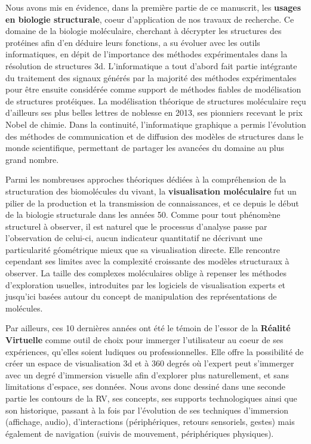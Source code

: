 Nous avons mis en évidence, dans la première partie de ce manuscrit, les \textbf{usages en biologie structurale}, coeur d'application de nos travaux de recherche. Ce domaine de la biologie moléculaire, cherchant à décrypter les structures des protéines afin d'en déduire leurs fonctions, a su évoluer avec les outils informatiques, en dépit de l'importance des méthodes expérimentales dans la résolution de structures 3d. 
L'informatique a tout d'abord fait partie intégrante du traitement des signaux générés par la majorité des méthodes expérimentales pour être ensuite considérée comme support de méthodes fiables de modélisation de structures protéiques. La modélisation théorique de structures moléculaire reçu d'ailleurs ses plus belles lettres de noblesse en 2013, ses pionniers recevant le prix Nobel de chimie. Dans la continuité, l'informatique graphique a permis l'évolution des méthodes de communication et de diffusion des modèles de structures dans le monde scientifique, permettant de partager les avancées du domaine au plus grand nombre.

Parmi les nombreuses approches théoriques dédiées à la compréhension de la structuration des biomolécules du vivant, la \textbf{visualisation moléculaire} fut un pilier de la production et la transmission de connaissances, et ce depuis le début de la biologie structurale dans les années 50. Comme pour tout phénomène structurel à observer, il est naturel que le processus d'analyse passe par l'observation de celui-ci, aucun indicateur quantitatif ne décrivant une particularité géométrique mieux que sa visualisation directe. Elle rencontre cependant ses limites avec la complexité croissante des modèles structuraux à observer. La taille des complexes moléculaires oblige à repenser les méthodes d'exploration usuelles, introduites par les logiciels de visualisation experts et jusqu'ici basées autour du concept de manipulation des représentations de molécules.



Par ailleurs, ces 10 dernières années ont été le témoin de l'essor de la \textbf{Réalité Virtuelle} comme outil de choix pour immerger l'utilisateur au coeur de ses expériences, qu'elles soient ludiques ou professionnelles. Elle offre la possibilité de créer un espace de visualisation 3d et à 360 degrés où l'expert peut s'immerger avec un degré d'immersion visuelle afin d'explorer plus naturellement, et sans limitations d'espace, ses données. Nous avons donc dessiné dans une seconde partie les contours de la RV, ses concepts, ses supports technologiques ainsi que son historique, passant à la fois par l'évolution de ses techniques d'immersion (affichage, audio), d'interactions (périphériques, retours sensoriels, gestes) mais également de navigation (suivis de mouvement, périphériques physiques). 

